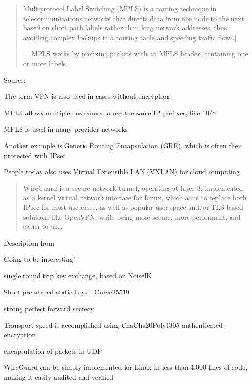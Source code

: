 \documentclass[Screen16to9,17pt]{foils}
\begin{document}

\begin{quote}
Multiprotocol Label Switching (MPLS) is a routing technique in telecommunications networks that directs data from one node to the next based on short path labels rather than long network addresses, thus avoiding complex lookups in a routing table and speeding traffic flows.[

...
MPLS works by prefixing packets with an MPLS header, containing one or more labels.
\end{quote}

Source:\\
{\footnotesize{}}

\begin{list2}
\item The term VPN is also used in cases without encryption
\item MPLS allows multiple customers to use the same IP prefixes, like 10/8
\item MPLS is used in many provider networks
\item Another example is Generic Routing Encapsulation (GRE), which is often then protected with IPsec
\item People today also uses Virtual Extensible LAN (VXLAN) for cloud computing
\end{list2}




\begin{quote}\small
WireGuard is a secure network tunnel, operating at layer 3, implemented as a kernel virtual network interface for Linux, which aims to replace both IPsec for most use cases, as well as popular user space and/or TLS-based solutions like OpenVPN, while being more secure, more performant, and easier to use.
\end{quote}

Description from 

\begin{list2}
\item Going to be interesting!
\item single round trip key exchange, based on NoiseIK
\item Short pre-shared static keys—Curve25519
\item strong perfect forward secrecy
\item Transport
speed is accomplished using ChaCha20Poly1305 authenticated-encryption
\item encapsulation of packets in UDP
\item WireGuard can be
simply implemented for Linux in less than 4,000 lines of code, making it easily audited and verified
\end{list2}
\end{document}
